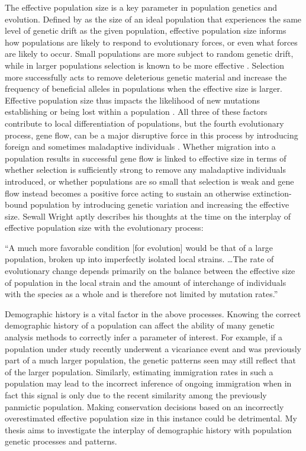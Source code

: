 The effective population size is a key parameter in population genetics and evolution. Defined by \citet{Wright:1931} as the size of an ideal population that experiences the same level of genetic drift as the given population, effective population size informs how populations are likely to respond to evolutionary forces, or even what forces are likely to occur. Small populations are more subject to random genetic drift, while in larger populations selection is known to be more effective \citep{Gravel:2016}. Selection more successfully acts to remove deleterious genetic material and increase the frequency of beneficial alleles in populations when the effective size is larger. Effective population size thus impacts the likelihood of new mutations establishing or being lost within a population \citep{Kimura:1962, Whitlock:2000}. All three of these factors contribute to local differentiation of populations, but the fourth evolutionary process, gene flow, can be a major disruptive force in this process by introducing foreign and sometimes maladaptive individuals \citep{Slatkin:1987}. Whether migration into a population results in successful gene flow is linked to effective size in terms of whether selection is sufficiently strong to remove any maladaptive individuals introduced, or whether populations are so small that selection is weak and gene flow instead becomes a positive force acting to sustain an otherwise extinction-bound population by introducing genetic variation and increasing the effective size. Sewall Wright aptly describes his thoughts at the time on the interplay of effective population size with the evolutionary process:
\begin{quoteshrink}
  ``A much more favorable condition [for evolution] would be that of a large population, broken up into imperfectly isolated local strains. \ldots The rate of evolutionary change depends primarily on the balance between the effective size of population in the local strain and the amount of interchange of individuals with the species as a whole and is therefore not limited by mutation rates.''
  \hfill\citet{Wright:1930}
\end{quoteshrink}

Demographic history is a vital factor in the above processes. Knowing the correct demographic history of a population can affect the ability of many genetic analysis methods to correctly infer a parameter of interest. For example, if a population under study recently underwent a vicariance event and was previously part of a much larger population, the genetic patterns seen may still reflect that of the larger population. Similarly, estimating immigration rates in such a population may lead to the incorrect inference of ongoing immigration when in fact this signal is only due to the recent similarity among the previously panmictic population. Making conservation decisions based on an incorrectly overestimated effective population size in this instance could be detrimental. My thesis aims to investigate the interplay of demographic history with population genetic processes and patterns.


